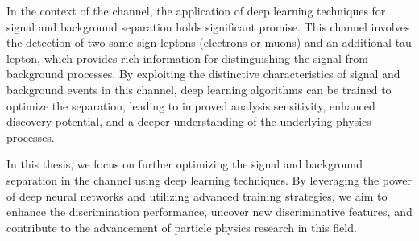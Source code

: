 In the context of the \lss channel, the application of deep learning techniques for signal and background separation
holds significant promise. This channel involves the detection of two same-sign leptons (electrons or muons) and an
additional tau lepton, which provides rich information for distinguishing the \ttH signal from background processes. By
exploiting the distinctive characteristics of signal and background events in this channel, deep learning algorithms can
be trained to optimize the separation, leading to improved analysis sensitivity, enhanced discovery potential, and a
deeper understanding of the underlying physics processes.

In this thesis, we focus on further optimizing the \ttH signal and background separation in the \lss channel using deep
learning techniques. By leveraging the power of deep neural networks and utilizing advanced training strategies, we aim
to enhance the discrimination performance, uncover new discriminative features, and contribute to the advancement of
particle physics research in this field.